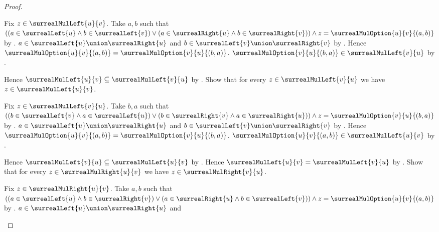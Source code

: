 \begin{proof}
\begin{subproof}
\begin{subproof}
            Fix $z\in\surrealMulLeft{u}{v}$.
            Take $a,b$ such that
                $((a\in\surrealLeft{u}\land b\in\surrealLeft{v})
                  \lor(a\in\surrealRight{u}\land b\in\surrealRight{v}))
                 \land z=\surrealMulOption{u}{v}{(a,b)}$
                by .
            $a\in\surrealLeft{u}\union\surrealRight{u}$ and
                $b\in\surrealLeft{v}\union\surrealRight{v}$
                by .
            Hence
                $\surrealMulOption{u}{v}{(a,b)}
                    =\surrealMulOption{v}{u}{(b,a)}$.
            $\surrealMulOption{v}{u}{(b,a)}
                \in\surrealMulLeft{v}{u}$
                by .
        \end{subproof}
        Hence $\surrealMulLeft{u}{v}\subseteq\surrealMulLeft{v}{u}$
            by .
        Show that for every $z\in\surrealMulLeft{v}{u}$ we have
            $z\in\surrealMulLeft{u}{v}$.
        \begin{subproof}
            Fix $z\in\surrealMulLeft{v}{u}$.
            Take $b,a$ such that
                $((b\in\surrealLeft{v}\land a\in\surrealLeft{u})
                  \lor(b\in\surrealRight{v}\land a\in\surrealRight{u}))
                 \land z=\surrealMulOption{v}{u}{(b,a)}$
                by .
            $a\in\surrealLeft{u}\union\surrealRight{u}$ and
                $b\in\surrealLeft{v}\union\surrealRight{v}$
                by .
            Hence
                $\surrealMulOption{u}{v}{(a,b)}
                    =\surrealMulOption{v}{u}{(b,a)}$.
            $\surrealMulOption{u}{v}{(a,b)}
                \in\surrealMulLeft{u}{v}$
                by .
        \end{subproof}
        Hence $\surrealMulLeft{v}{u}\subseteq\surrealMulLeft{u}{v}$
            by .
        Hence $\surrealMulLeft{u}{v}=\surrealMulLeft{v}{u}$
            by .
        Show that for every $z\in\surrealMulRight{u}{v}$ we have
            $z\in\surrealMulRight{v}{u}$.
        \begin{subproof}
            Fix $z\in\surrealMulRight{u}{v}$.
            Take $a,b$ such that
                $((a\in\surrealLeft{u}\land b\in\surrealRight{v})
                  \lor(a\in\surrealRight{u}\land b\in\surrealLeft{v}))
                 \land z=\surrealMulOption{u}{v}{(a,b)}$
                by .
            $a\in\surrealLeft{u}\union\surrealRight{u}$ and

\end{subproof}
\end{subproof}
\end{proof}
